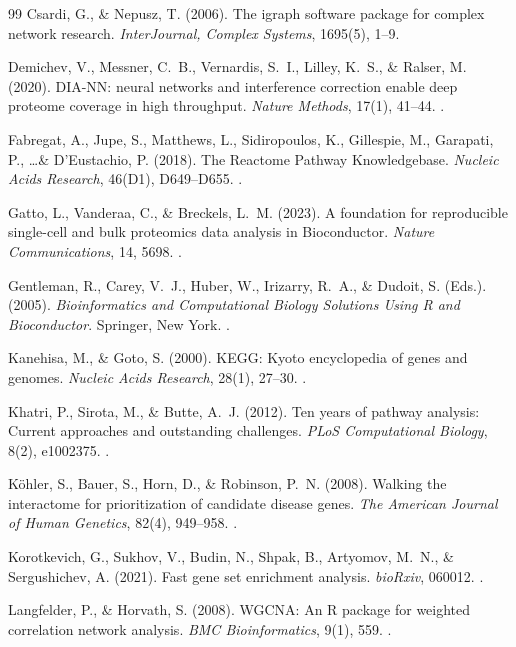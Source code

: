 \documentclass[11pt,oneside]{book}
\begin{document}
\begin{thebibliography}{99}
Csardi, G., \& Nepusz, T. (2006). The igraph software package for complex network research. \textit{InterJournal, Complex Systems}, 1695(5), 1--9.

Demichev, V., Messner, C.~B., Vernardis, S.~I., Lilley, K.~S., \& Ralser, M. (2020). DIA-NN: neural networks and interference correction enable deep proteome coverage in high throughput. \textit{Nature Methods}, 17(1), 41--44. .

Fabregat, A., Jupe, S., Matthews, L., Sidiropoulos, K., Gillespie, M., Garapati, P., \dots \& D'Eustachio, P. (2018). The Reactome Pathway Knowledgebase. \textit{Nucleic Acids Research}, 46(D1), D649--D655. .

Gatto, L., Vanderaa, C., \& Breckels, L.~M. (2023). A foundation for reproducible single-cell and bulk proteomics data analysis in Bioconductor. \textit{Nature Communications}, 14, 5698. .

Gentleman, R., Carey, V.~J., Huber, W., Irizarry, R.~A., \& Dudoit, S. (Eds.). (2005). \textit{Bioinformatics and Computational Biology Solutions Using R and Bioconductor}. Springer, New York. .

Kanehisa, M., \& Goto, S. (2000). KEGG: Kyoto encyclopedia of genes and genomes. \textit{Nucleic Acids Research}, 28(1), 27--30. .

Khatri, P., Sirota, M., \& Butte, A.~J. (2012). Ten years of pathway analysis: Current approaches and outstanding challenges. \textit{PLoS Computational Biology}, 8(2), e1002375. .

K{\"o}hler, S., Bauer, S., Horn, D., \& Robinson, P.~N. (2008). Walking the interactome for prioritization of candidate disease genes. \textit{The American Journal of Human Genetics}, 82(4), 949--958. .

Korotkevich, G., Sukhov, V., Budin, N., Shpak, B., Artyomov, M.~N., \& Sergushichev, A. (2021). Fast gene set enrichment analysis. \textit{bioRxiv}, 060012. .

Langfelder, P., \& Horvath, S. (2008). WGCNA: An R package for weighted correlation network analysis. \textit{BMC Bioinformatics}, 9(1), 559. .


\end{thebibliography}
\end{document}
